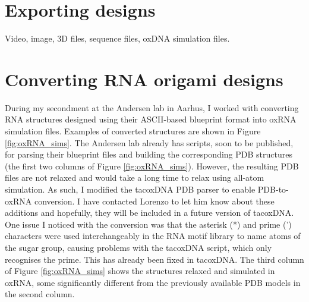 \section{Exporting designs}
Video, image, 3D files, sequence files, oxDNA simulation files.


\section{Converting RNA origami designs}
During my secondment at the Andersen lab in Aarhus, I worked with converting RNA structures designed using their ASCII-based blueprint format into oxRNA simulation files. Examples of converted structures are shown in Figure \ref{fig:oxRNA_sims}. The Andersen lab already has scripts, soon to be published, for parsing their blueprint files and building the corresponding PDB structures (the first two columns of Figure \ref{fig:oxRNA_sims}). However, the resulting PDB files are not relaxed and would take a long time to relax using all-atom simulation. As such, I modified the tacoxDNA \cite{suma2019tacoxdna} PDB parser to enable PDB-to-oxRNA conversion. I have contacted Lorenzo to let him know about these additions and hopefully, they will be included in a future version of tacoxDNA. One issue I noticed with the conversion was that the asterisk (*) and prime (') characters were used interchangeably in the RNA motif library to name atoms of the sugar group, causing problems with the tacoxDNA script, which only recognises the prime. This has already been fixed in tacoxDNA. The third column of Figure \ref{fig:oxRNA_sims} shows the structures relaxed and simulated in oxRNA, some significantly different from the previously available PDB models in the second column.


